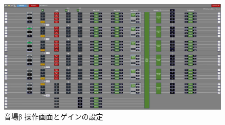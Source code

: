 \documentclass[11pt,a4j]{jreport}
\begin{document}
\newpage

\begin{figure}[H]
  \centering
  \includegraphics[width=.9\linewidth]{images/experimentField/afcParameters/02beta/01overall.jpg}
  \caption{音場β 操作画面とゲインの設定}
  \label{fig:beta操作画面}
\end{figure}
\end{document}
